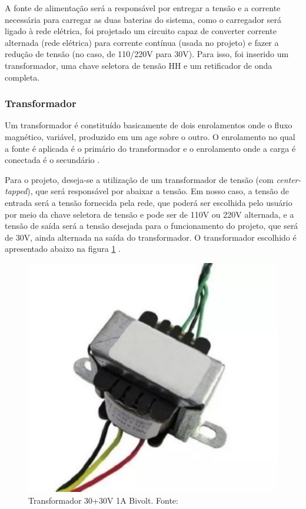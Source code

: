 \par A fonte de alimentação será a  responsável por entregar a tensão e a corrente necessária para carregar as duas baterias do sistema, como o carregador será ligado à rede elétrica, foi projetado um circuito capaz de converter corrente alternada (rede elétrica) para corrente contínua (usada no projeto) e fazer a redução de tensão (no caso, de 110/220V para 30V). Para isso, foi inserido um transformador, uma chave seletora de tensão HH e um retificador de onda completa.

\subsubsection{Transformador}
    
\par Um transformador é constituído basicamente de dois enrolamentos onde o fluxo magnético, variável, produzido em um age sobre o outro. O enrolamento no qual a fonte é aplicada é o primário do transformador e o enrolamento onde a carga é conectada é o secundário \cite{transformadores}.

\par Para o projeto, deseja-se a utilização de um transformador de tensão (com \textit{center-tapped}), que será responsável por abaixar a tensão. Em nosso caso, a tensão de entrada será a tensão fornecida pela rede, que poderá ser escolhida pelo usuário por meio da chave seletora de tensão e pode ser de 110V ou 220V alternada, e a tensão de saída será a tensão desejada para o funcionamento do projeto, que será de 30V, ainda alternada na saída do transformador. O transformador escolhido é apresentado abaixo na figura \ref{transformador1} .

\begin{figure}[H]
	\centering
		\includegraphics[keepaspectratio=true,scale=0.5]{figuras/transformador1.JPG}
	\caption{Transformador 30+30V 1A Bivolt. Fonte: \cite{HUNION}}
	\label{transformador1}
\end{figure}


